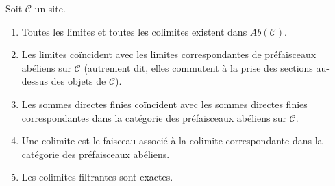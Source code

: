 \begin{lemma}
\label{lemma-limits-colimits-abelian-sheaves}
Soit $\mathcal{C}$ un site.
\begin{enumerate}
\item Toutes les limites et toutes les colimites existent dans
$\textit{Ab}(\mathcal{C})$.
\item Les limites coïncident avec les limites correspondantes de préfaisceaux
abéliens sur $\mathcal{C}$ (autrement dit, elles commutent à la prise des
sections au-dessus des objets de $\mathcal{C}$).
\item Les sommes directes finies coïncident avec les sommes directes finies
correspondantes dans la catégorie des préfaisceaux abéliens sur $\mathcal{C}$.
\item Une colimite est le faisceau associé à la colimite correspondante dans la
catégorie des préfaisceaux abéliens.
\item Les colimites filtrantes sont exactes.
\end{enumerate}
\end{lemma}

